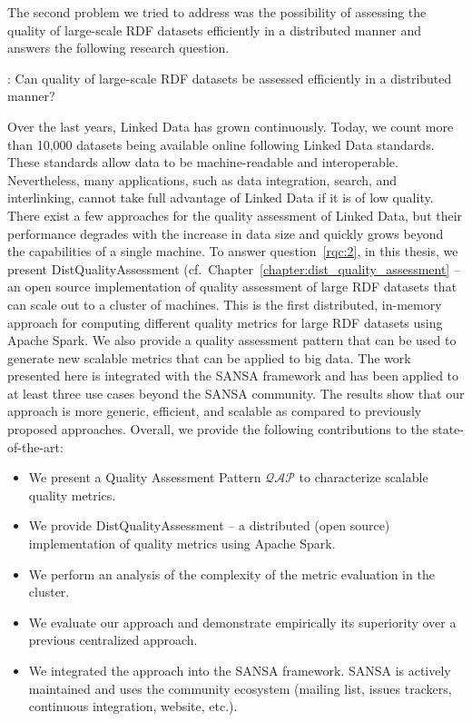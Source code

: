The second problem we tried to address was the possibility of assessing the quality of large-scale \gls{RDF} datasets efficiently in a distributed manner and answers the following research question.

\begin{tcolorbox}
\textbf{\rqNr[RQ2]\label{rqc:2}}: Can quality of large-scale \gls{RDF} datasets be assessed efficiently in a distributed manner?
\end{tcolorbox}

Over the last years, Linked Data has grown continuously. 
Today, we count more than 10,000 datasets being available online following Linked Data standards. 
These standards allow data to be machine-readable and interoperable.  
Nevertheless, many applications, such as data integration, search, and interlinking, cannot take full advantage of Linked Data if it is of low quality.
There exist a few approaches for the quality assessment of Linked Data, but their performance degrades with the increase in data size and quickly grows beyond the capabilities of a single machine.
To answer question~\ref{rqc:2}, in this thesis, we present DistQualityAssessment (cf.\ Chapter~\ref{chapter:dist_quality_assessment} -- an open source implementation of quality assessment of large \gls{RDF} datasets that can scale out to a cluster of machines.
This is the first distributed, in-memory approach for computing different quality metrics for large \gls{RDF} datasets using Apache Spark. We also provide a quality assessment pattern that can be used to generate new scalable metrics that can be applied to big data.
The work presented here is integrated with the SANSA framework and has been applied to at least three use cases beyond the SANSA community.   
The results show that our approach is more generic, efficient, and scalable as compared to previously proposed approaches.
Overall, we provide the following contributions to the state-of-the-art:

\begin{itemize}
    \item We present a Quality Assessment Pattern $\mathcal{QAP}$ to characterize scalable quality metrics.
    \item We provide DistQualityAssessment -- a distributed (open source) implementation of quality metrics using Apache Spark.
    \item We perform an analysis of the complexity of the metric evaluation in the cluster.
    \item We evaluate our approach and demonstrate empirically its superiority over a previous centralized approach.
    \item We integrated the approach into the SANSA framework.
    SANSA is actively maintained and uses the community ecosystem (mailing list, issues trackers, continuous integration, website, etc.).
\end{itemize}

